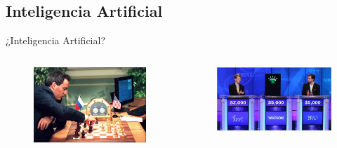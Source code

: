 \documentclass[10pt]{beamer}
\begin{document}
\subsection{Inteligencia Artificial}
\begin{frame}{¿Inteligencia Artificial?}

    \begin{columns}
        \begin{column}{0.32\textwidth}
            \begin{figure}[!h] 
                \centering
                \includegraphics[width=1\textwidth]{img/deepblue}
            \end{figure}                
        \end{column}
        \begin{column}{0.32\textwidth}
            \begin{figure}[!h] 
                \centering
                \includegraphics[width=1\textwidth]{img/watson}
            \end{figure}                

\end{column}
\end{columns}
\end{frame}
\end{document}
